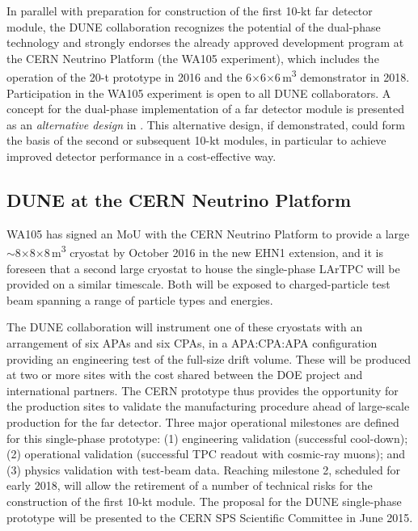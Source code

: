In parallel with preparation for construction of the first 10-kt far detector module, 
the DUNE collaboration recognizes the potential of the dual-phase technology and 
strongly endorses the already approved development program at the CERN Neutrino 
Platform (the WA105 experiment), which includes the operation of the 20-t prototype 
in 2016 and the 6$\times$6$\times$6\,m\textsuperscript{3} demonstrator in 2018. Participation 
in the WA105 experiment is open to all DUNE collaborators. A concept for the dual-phase 
implementation of a far detector module is presented as an \textit{alternative 
design} in \voldune. This alternative design, if demonstrated, 
could form the basis of the second or subsequent 10-kt modules, in 
particular to achieve improved detector performance in a cost-effective way. 

\subsection{DUNE at the CERN Neutrino Platform}
\label{v1ch3:dune-at-cern}

WA105 has signed an MoU with the CERN Neutrino Platform to provide a large 
$\sim$8$\times$8$\times$8\,m\textsuperscript{3} cryostat by October 2016 in the new EHN1 extension, 
and it is foreseen that a second large cryostat to house the single-phase LArTPC will 
be provided on a similar timescale. Both will be exposed to charged-particle test 
beam spanning a range of particle types and energies.   

The DUNE collaboration will instrument one of these cryostats with an arrangement 
of six APAs and six CPAs, in a APA:CPA:APA configuration providing an engineering 
test of the full-size drift volume. These will be produced at two or more sites with the cost 
shared between the DOE project and international partners. The CERN prototype thus 
provides the opportunity for the production sites to validate the manufacturing 
procedure ahead of large-scale production for the far detector. Three major operational 
milestones are defined for this single-phase prototype: (1) engineering validation 
(successful cool-down); (2) operational validation (successful TPC readout with 
cosmic-ray muons); and (3) physics validation with test-beam data. Reaching milestone 
2, scheduled for early 2018, will allow the retirement of a number of technical 
risks for the construction of the first 10-kt module. The proposal for the DUNE 
single-phase prototype will be presented to the CERN SPS Scientific Committee in June 2015. 

